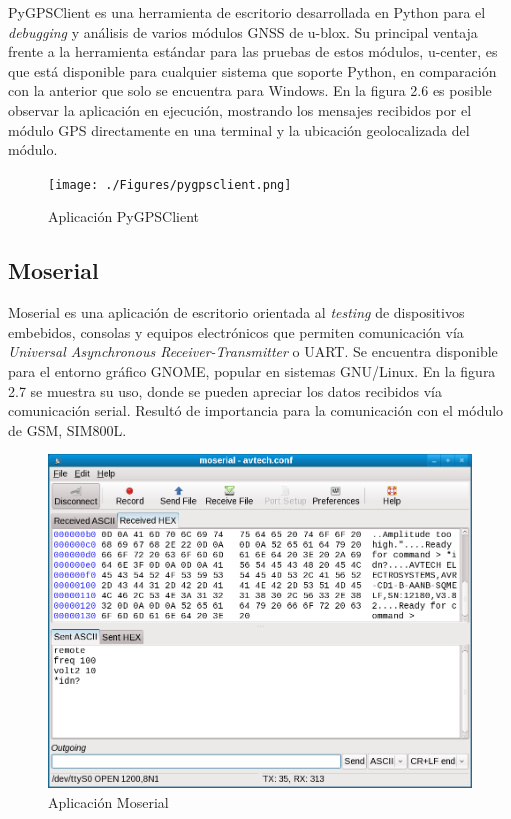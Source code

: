 PyGPSClient es una herramienta de escritorio desarrollada en Python para el \textit{debugging} y análisis de varios módulos GNSS de u-blox. Su principal ventaja frente a la herramienta estándar para las pruebas de estos módulos, u-center, es que está disponible para cualquier sistema que soporte Python, en comparación con la anterior que solo se encuentra para Windows\citep{PYGPSCLIENT:1}. En la figura 2.6 es posible observar la aplicación en ejecución, mostrando los mensajes recibidos por el módulo GPS directamente en una terminal y la ubicación geolocalizada del módulo.

\begin{figure}[H]
	\centering
	\texttt{[image: ./Figures/pygpsclient.png]}
	\caption{Aplicación PyGPSClient}
	\label{fig:texmaker}
\end{figure}

\subsection{Moserial}

Moserial es una aplicación de escritorio orientada al \textit{testing} de dispositivos embebidos, consolas y equipos electrónicos que permiten comunicación vía \textit{Universal Asynchronous Receiver-Transmitter} o UART. Se encuentra disponible para el entorno gráfico GNOME, popular en sistemas GNU/Linux. En la figura 2.7 se muestra su uso, donde se pueden apreciar los datos recibidos vía comunicación serial. Resultó de importancia para la comunicación con el módulo de GSM, SIM800L.

\begin{figure}[H]
	\centering
	\includegraphics[width=1\textwidth]{./Figures/moserial.png}
	\caption{Aplicación Moserial}
	\label{fig:texmaker}
\end{figure}


